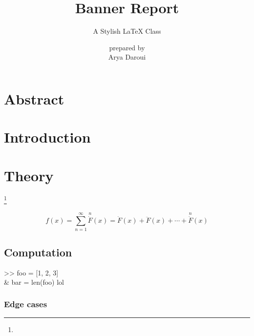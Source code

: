 \documentclass{bannerReport}
\title{Banner Report}
\subtitle{A Stylish \LaTeX \hspace{.008em} Class}
\author{ {\small prepared by} \\ Arya Daroui}
\begin{document}

	\section*{Abstract}
		\lipsum[1]

	\section{Introduction}
		\lipsum[2]

	\section{Theory}
		\lipsum[3] \footnote{\lipsum[10][1]}
		\begin{dent}{}
			\lipsum[8]
			$$
			f(x) = \sum^\infty _{n = 1} \overset{n}{\dot{F}}(x)  = \dot{F}(x) + \ddot{F}(x) +\cdots + \overset{n}{\dot{F}}(x) 
			$$
		\end{dent}

		\subsection{Computation}
			\lipsum[4]
			
			\begin{dent}{>>}
				\mono foo = [1, 2, 3] \\
				& \mono bar = len(foo) lol
			\end{dent}
			
			
			
			\subsubsection{Edge cases}
				\lipsum[5]
\end{document}
